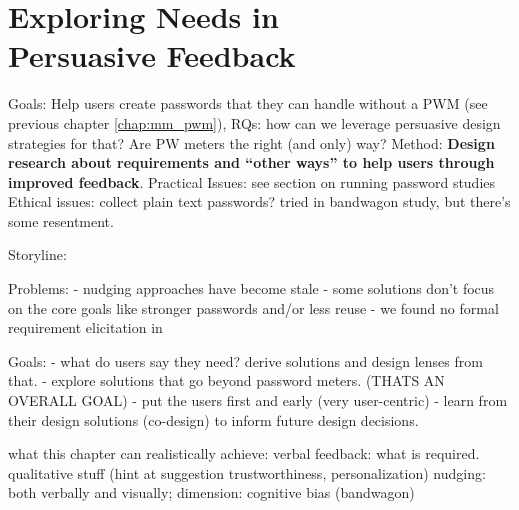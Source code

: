 \chapter[Exploring Needs in Persuasive Feedback] {Exploring Needs in\\ Persuasive Feedback}\label{chap:feedback_modalities}




Goals: Help users create passwords that they can handle without a PWM (see previous chapter \ref{chap:mm_pwm}),
RQs: how can we leverage persuasive design strategies for that? Are PW meters the right (and only) way?
Method: \textbf{Design research about requirements and ``other ways'' to help users through improved feedback}.
Practical Issues: see section on running password studies
Ethical issues: collect plain text passwords? tried in bandwagon study, but there's some resentment. 


Storyline:

Problems:
- nudging approaches have become stale
- some solutions don't focus on the core goals like stronger passwords and/or less reuse
- we found no formal requirement elicitation in 

Goals:
- what do users say they need? derive solutions and design lenses from that. 
- explore solutions that go beyond password meters. (THATS AN OVERALL GOAL)
- put the users first and early (very user-centric)
- learn from their design solutions (co-design) to inform future design decisions.


what this chapter can realistically achieve: 
verbal feedback: what is required. qualitative stuff (hint at suggestion trustworthiness, personalization)
nudging: both verbally and visually; dimension: cognitive bias (bandwagon)

